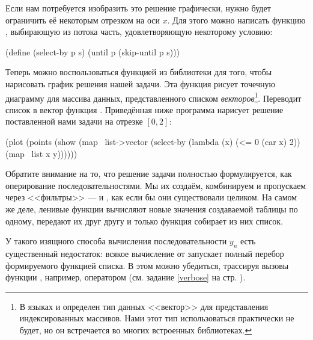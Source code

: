 Если нам потребуется изобразить это решение графически, нужно будет ограничить её некоторым отрезком на оси $x$. Для этого можно написать функцию , выбирающую из потока часть, удовлетворяющую некоторому условию:
\begin{Definition}
(define (select-by p s)
  (until p (skip-until p s)))
\end{Definition}

Теперь можно воспользоваться функцией  из библиотеки  для того, чтобы нарисовать график решения нашей задачи. Эта функция рисует точечную диаграмму для массива данных, представленного списком \emph{векторов}\footnote{В языках  и \Scheme определен тип данных <<вектор>> для представления индексированных массивов. Нами этот тип использоваться практически не будет, но он встречается во многих встроенных библиотеках.}. Переводит список в вектор функция . Приведённая ниже программа нарисует решение поставленной нами задачи на отрезке $[0,2]$:
\begin{SchemeCode}
(plot (points 
       (show 
        (map~ list->vector
              (select-by (lambda (x) (<= 0 (car x) 2))
                         (map~ list x y))))))
\end{SchemeCode}

Обратите внимание на то, что решение задачи полностью формулируется, как оперирование последовательностями. Мы их создаём, комбинируем и пропускаем через <<фильтры>> ---  и , как если бы они существовали целиком. На самом же деле, ленивые функции вычисляют новые значения создаваемой таблицы по одному, передают их друг другу и только функция  собирает из них список.

У такого изящного способа вычисления последовательности $y_n$ есть существенный недостаток: всякое вычисление  от  запускает полный перебор формируемого функцией  списка. В этом можно убедиться, трассируя вызовы функции , например, оператором  (см. задание \ref{verbose} на стр. \pageref{verbose}).
\vspace{-\smallskipamount}
\vspace{-\smallskipamount}
\vspace{-\smallskipamount}
\vspace{-\smallskipamount}
\vspace{-\smallskipamount}
\vspace{-\smallskipamount}
\vspace{-\smallskipamount}

